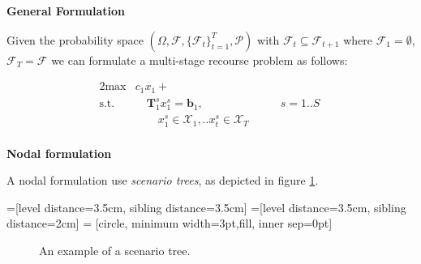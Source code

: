\textbf{General Formulation}

Given the probability space $(\Omega, \mathcal{F}, \{ \mathcal{F}_{t} \}_{t=1}^T, \mathcal{P})$ 
with $\mathcal{F}_t \subseteq \mathcal{F}_{t+1}$ where $\mathcal{F}_1 = \emptyset$, 
$\mathcal{F}_T = \mathcal{F}$ we can formulate a multi-stage recourse problem as follows:

\begin{alignat}{2}
\textrm{max} & c_1 x_1 +  & \\
\text{s.t.}  & \quad \bm{T}_1^s x_1^s = \bm{b}_1, & \quad \quad s=1..S\ \\
             & \quad \quad x_1^s \in \mathcal{X}_1, .. x_t^s \in \mathcal{X}_T & \ \\
\end{alignat}

\textbf{Nodal formulation}

A nodal formulation use \emph{scenario trees}, as depicted in figure \ref{fig:stex}.

=[level distance=3.5cm, sibling distance=3.5cm]
=[level distance=3.5cm, sibling distance=2cm]
 = [circle, minimum width=3pt,fill, inner sep=0pt]
\begin{figure}[h!]
\begin{center}
\end{center}
\caption{An example of a scenario tree.}
\label{fig:stex}
\end{figure}

